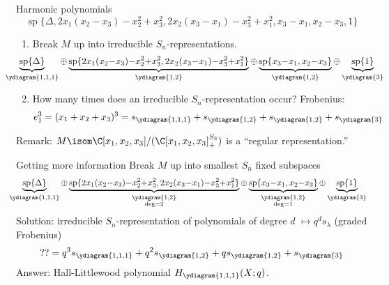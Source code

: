 \documentclass[dvipsnames,handout]{beamer}
\renewcommand{\Span}{\operatorname{sp}}
\theoremstyle{definition}
\newcounter{c}
\begin{document}
\begin{frame}{Harmonic polynomials}
\[
\Span\{\Delta, 2x_1(x_2-x_3)-x_2^2+x_3^2,
            2x_2(x_3-x_1)-x_3^2+x_1^2, 
       x_3-x_1, x_2-x_3,1\}
  \]\pause 
  \begin{enumerate}
\item Break \(M\) up into irreducible \(S_n\)-representations. \pause
  \[
    \hspace{-2.9em}
    \scalebox{0.95}{\(
      \underbrace{\Span\{\Delta\}}_{\ydiagram{1,1,1}} {\oplus} \underbrace{\Span\{2x_1(x_2{-}x_3){-}x_2^2{+}x_3^2,
        2x_2(x_3{-}x_1){-}x_3^2{+}x_1^2\}}_{\ydiagram{1,2}} {\oplus}
      \underbrace{\Span\{x_3{-}x_1, x_2{-}x_3\}}_{\ydiagram{1,2}} {\oplus} \underbrace{\Span\{1\}}_{\ydiagram{3}}\)}
  \]\pause
  \item How many times does an irreducible \(S_n\)-representation occur? \pause
    Frobenius: \pause
    \[
      e_1^3 = (x_1+x_2+x_3)^3 = s_{\ydiagram{1,1,1}} + s_{\ydiagram{1,2}} +
      s_{\ydiagram{1,2}} + s_{\ydiagram{3}}
    \]
  \end{enumerate}
  \pause
  Remark: \(M \isom \C[x_1,x_2,x_3]/(\C[x_1,x_2,x_3]^{S_3}_+)\) is a
  ``regular representation.''
\end{frame}
\begin{frame}{Getting more information}
  \pause
  Break \(M\) up into smallest \(S_n\) fixed subspaces 
  \[
    \hspace{-0.75em}
    \scalebox{0.95}{\(
      \underbrace{\Span\{\Delta\}}_{\ydiagram{1,1,1}} {\oplus} \underbrace{\Span\{2x_1(x_2{-}x_3){-}x_2^2{+}x_3^2,
        2x_2(x_3{-}x_1){-}x_3^2{+}x_1^2\}}_{\substack{\ydiagram{1,2}\\\deg
        = 2}} {\oplus}
      \underbrace{\Span\{x_3{-}x_1, x_2{-}x_3\}}_{\substack{\ydiagram{1,2}\\\deg=1}} {\oplus} \underbrace{\Span\{1\}}_{\ydiagram{3}}\)}
  \]
  \pause
  Solution: irreducible \(S_n\)-representation of polynomials of degree \(d\) \(\mapsto q^d
  s_\lambda\) (graded Frobenius)\[
    ?? = q^3 s_{\ydiagram{1,1,1}} + q^2 s_{\ydiagram{1,2}} + q
    s_{\ydiagram{1,2}} + s_{\ydiagram{3}}
  \]\pause
  Answer: Hall-Littlewood polynomial \(H_{\ydiagram{1,1,1}}(X;q)\).
\end{frame}
\end{document}
